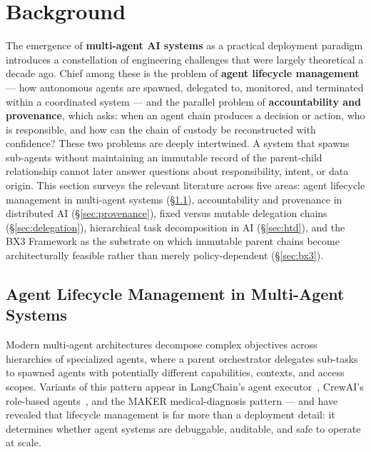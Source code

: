 \section{Background}

The emergence of \textbf{multi-agent AI systems} as a practical deployment paradigm introduces a constellation of engineering challenges that were largely theoretical a decade ago. Chief among these is the problem of \textbf{agent lifecycle management} — how autonomous agents are spawned, delegated to, monitored, and terminated within a coordinated system — and the parallel problem of \textbf{accountability and provenance}, which asks: when an agent chain produces a decision or action, who is responsible, and how can the chain of custody be reconstructed with confidence? These two problems are deeply intertwined. A system that spawns sub-agents without maintaining an immutable record of the parent-child relationship cannot later answer questions about responsibility, intent, or data origin. This section surveys the relevant literature across five areas: agent lifecycle management in multi-agent systems (\S\ref{sec:lifecycle}), accountability and provenance in distributed AI (\S\ref{sec:provenance}), fixed versus mutable delegation chains (\S\ref{sec:delegation}), hierarchical task decomposition in AI (\S\ref{sec:htd}), and the BX3 Framework as the substrate on which immutable parent chains become architecturally feasible rather than merely policy-dependent (\S\ref{sec:bx3}).

\subsection{Agent Lifecycle Management in Multi-Agent Systems}
\label{sec:lifecycle}

Modern multi-agent architectures decompose complex objectives across hierarchies of specialized agents, where a parent orchestrator delegates sub-tasks to spawned agents with potentially different capabilities, contexts, and access scopes. Variants of this pattern appear in LangChain's agent executor~\cite{langchain2023}, CrewAI's role-based agents~\cite{crewai2024}, and the MAKER medical-diagnosis pattern — and have revealed that lifecycle management is far more than a deployment detail: it determines whether agent systems are debuggable, auditable, and safe to operate at scale.

